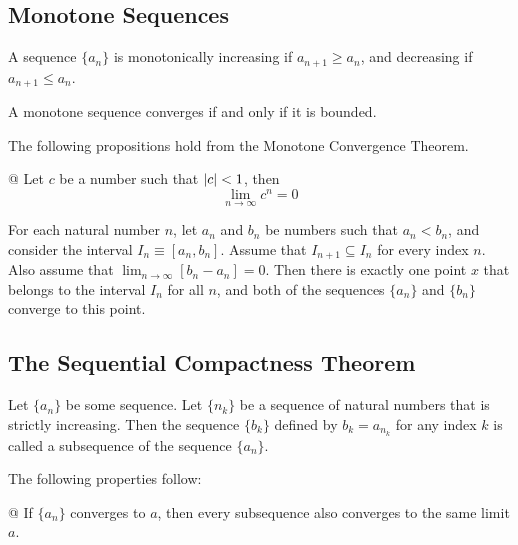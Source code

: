     \subsection{Monotone Sequences}
    A sequence $\{a_n\}$ is monotonically increasing if $a_{n+1} \ge a_n$, and decreasing if $a_{n+1} \le a_n$.

    \begin{thm}
        A monotone sequence converges if and only if it is bounded.
    \end{thm}

    The following propositions hold from the Monotone Convergence Theorem.

    \begin{easylist}
        @ Let $c$ be a number such that ${\left\lvert c \right\rvert} < 1$, then
        \[
            \lim_{n \to \infty} c^n = 0
        \]
    \end{easylist}

    \begin{thm}
        For each natural number $n$, let $a_n$ and $b_n$ be numbers such that $a_n < b_n$, and consider the interval
        $I_n \equiv [a_n, b_n]$. Assume that $I_{n + 1} \subseteq I_n$ for every index $n$. Also assume that
        $\lim_{n\to\infty} [b_n - a_n] = 0$. Then there is exactly one point $x$ that belongs to the interval $I_n$ for
        all $n$, and both of the sequences $\{a_n\}$ and $\{b_n\}$ converge to this point.
    \end{thm}

    \subsection{The Sequential Compactness Theorem}
    \begin{definition}[Subsequence]
        Let $\{a_n\}$ be some sequence. Let $\{n_k\}$ be a sequence of natural numbers that is strictly increasing. Then
        the sequence $\{b_k\}$ defined by $b_k = a_{n_k}$ for any index $k$ is called a subsequence of the sequence
        $\{a_n\}$.
    \end{definition}

    The following properties follow:

    \begin{easylist}[itemize]
        @ If $\{a_n\}$ converges to $a$, then every subsequence also converges to the same limit $a$.
    \end{easylist}

